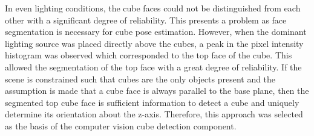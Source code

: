 In even lighting conditions, the cube faces could not be distinguished from each other with a significant degree of reliability. This presents a problem as face segmentation is necessary for cube pose estimation. However, when the dominant lighting source was placed directly above the cubes, a peak in the pixel intensity histogram was observed which corresponded to the top face of the cube. This allowed the segmentation of the top face with a great degree of reliability. If the scene is constrained such that cubes are the only objects present and the assumption is made that a cube face is always parallel to the base plane, then the segmented top cube face is sufficient information to detect a cube and uniquely determine its orientation about the z-axis. Therefore, this approach was selected as the basis of the computer vision cube detection component.

